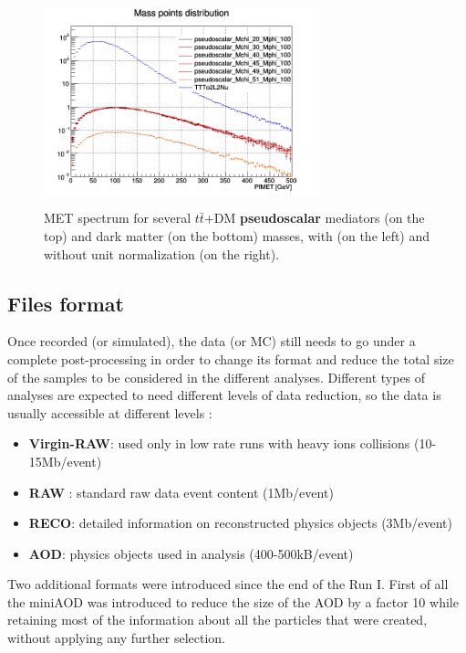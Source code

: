 \documentclass[a4paper, 10pt, openright]{report}
\begin{document}
\begin{figure}[htbp]
{\begin{minipage}[b]{.49\textwidth}
\includegraphics[width=8cm, height=6cm]{figs/pseudoscalarMETmChiLarge.png}
\end{minipage} \hfill
}
\caption{\ac{MET} spectrum for several $t \bar t$+DM \textbf{pseudoscalar} mediators (on the top) and dark matter (on the bottom) masses, with (on the left) and without unit normalization (on the right).}
\label{fig:signalPseudoscalar}
\end{figure}

\subsection{Files format} \label{section:Files}

Once recorded (or simulated), the data (or \ac{MC}) still needs to go under a complete post-processing in order to change its format and reduce the total size of the samples to be considered in the different analyses. Different types of analyses are expected to need different levels of data reduction, so the data is usually accessible at different levels \cite{nanoAOD}:

\begin{itemize}
\item \textbf{Virgin-RAW}: used only in low rate runs with heavy ions collisions (10-15Mb/event)
\item \textbf{RAW} : standard raw data event content (1Mb/event)
\item \textbf{RECO}: detailed information on reconstructed physics objects (3Mb/event)
\item \textbf{\ac{AOD}}: physics objects used in analysis (400-500kB/event)
\end{itemize}

Two additional formats were introduced since the end of the Run I. First of all the miniAOD was introduced to reduce the size of the \ac{AOD} by a factor 10 while retaining most of the information about all the particles that were created, without applying any further selection.
\end{document}
